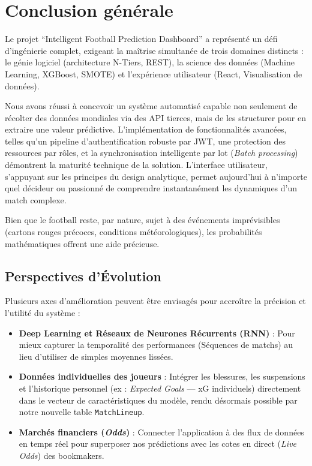 \documentclass[12pt,a4paper,oneside]{book}
\begin{document}
\chapter*{Conclusion générale}

Le projet ``Intelligent Football Prediction Dashboard'' a représenté un défi d'ingénierie complet, exigeant la maîtrise simultanée de trois domaines distincts : le génie logiciel (architecture N-Tiers, REST), la science des données (Machine Learning, XGBoost, SMOTE) et l'expérience utilisateur (React, Visualisation de données).

Nous avons réussi à concevoir un système automatisé capable non seulement de récolter des données mondiales via des API tierces, mais de les structurer pour en extraire une valeur prédictive. L'implémentation de fonctionnalités avancées, telles qu'un pipeline d'authentification robuste par JWT, une protection des ressources par rôles, et la synchronisation intelligente par lot (\textit{Batch processing}) démontrent la maturité technique de la solution. L'interface utilisateur, s'appuyant sur les principes du design analytique, permet aujourd'hui à n'importe quel décideur ou passionné de comprendre instantanément les dynamiques d'un match complexe.

Bien que le football reste, par nature, sujet à des événements imprévisibles (cartons rouges précoces, conditions météorologiques), les probabilités mathématiques offrent une aide précieuse.

\section*{Perspectives d'Évolution}
Plusieurs axes d'amélioration peuvent être envisagés pour accroître la précision et l'utilité du système :
\begin{itemize}
    \item \textbf{Deep Learning et Réseaux de Neurones Récurrents (RNN)} : Pour mieux capturer la temporalité des performances (Séquences de matchs) au lieu d'utiliser de simples moyennes lissées.
    \item \textbf{Données individuelles des joueurs} : Intégrer les blessures, les suspensions et l'historique personnel (ex : \textit{Expected Goals} --- xG individuels) directement dans le vecteur de caractéristiques du modèle, rendu désormais possible par notre nouvelle table \texttt{MatchLineup}.
    \item \textbf{Marchés financiers (\textit{Odds})} : Connecter l'application à des flux de données en temps réel pour superposer nos prédictions avec les cotes en direct (\textit{Live Odds}) des bookmakers.
\end{itemize}
\end{document}
